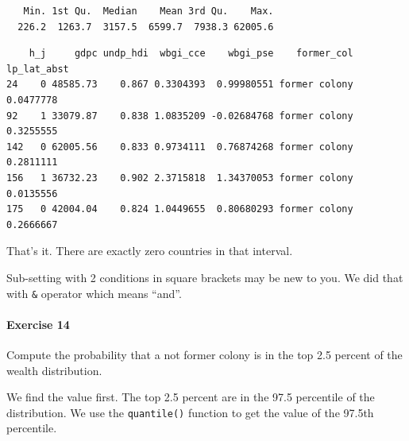 \documentclass[]{article}
\newenvironment{Shaded}{\begin{snugshade}}{\end{snugshade}}
\newcommand{\KeywordTok}[1]{\textcolor[rgb]{0.13,0.29,0.53}{\textbf{#1}}}
\newcommand{\DecValTok}[1]{\textcolor[rgb]{0.00,0.00,0.81}{#1}}
\newcommand{\StringTok}[1]{\textcolor[rgb]{0.31,0.60,0.02}{#1}}
\newcommand{\CommentTok}[1]{\textcolor[rgb]{0.56,0.35,0.01}{\textit{#1}}}
\newcommand{\OperatorTok}[1]{\textcolor[rgb]{0.81,0.36,0.00}{\textbf{#1}}}
\newcommand{\NormalTok}[1]{#1}
\let\oldparagraph\paragraph
\renewcommand{\paragraph}[1]{\oldparagraph{#1}\mbox{}}
\theoremstyle{definition}
\theoremstyle{definition}
\theoremstyle{definition}
\theoremstyle{remark}
\begin{document}
\begin{verbatim}
   Min. 1st Qu.  Median    Mean 3rd Qu.    Max. 
  226.2  1263.7  3157.5  6599.7  7938.3 62005.6 
\end{verbatim}

\begin{Shaded}
\end{Shaded}

\begin{verbatim}
    h_j     gdpc undp_hdi  wbgi_cce    wbgi_pse    former_col lp_lat_abst
24    0 48585.73    0.867 0.3304393  0.99980551 former colony   0.0477778
92    1 33079.87    0.838 1.0835209 -0.02684768 former colony   0.3255555
142   0 62005.56    0.833 0.9734111  0.76874268 former colony   0.2811111
156   1 36732.23    0.902 2.3715818  1.34370053 former colony   0.0135556
175   0 42004.04    0.824 1.0449655  0.80680293 former colony   0.2666667
\end{verbatim}

That's it. There are exactly zero countries in that interval.

Sub-setting with 2 conditions in square brackets may be new to you. We
did that with \texttt{\&} operator which means ``and''.

\paragraph{Exercise 14}\label{exercise-14}

Compute the probability that a not former colony is in the top 2.5
percent of the wealth distribution.

We find the value first. The top 2.5 percent are in the 97.5 percentile
of the distribution. We use the \texttt{quantile()} function to get the
value of the 97.5th percentile.

\begin{Shaded}
\end{Shaded}
\end{document}
